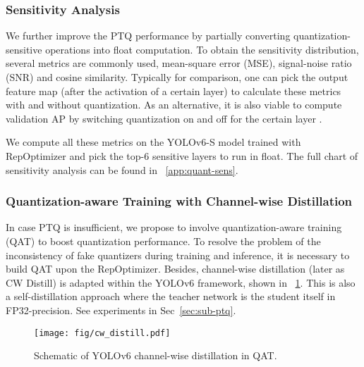 \documentclass[10pt,twocolumn,letterpaper]{article}
\begin{document}
\subsubsection{Sensitivity Analysis}\label{quant:sens}
We further improve the PTQ performance by partially converting quantization-sensitive operations into float computation. To obtain the sensitivity distribution, several metrics are commonly used, mean-square error (MSE), signal-noise ratio (SNR) and cosine similarity. Typically for comparison, one can pick the output feature map (after the activation of a certain layer) to calculate these metrics with and without quantization. As an alternative, it is also viable to compute validation AP by switching quantization on and off for the certain layer \cite{nvidia2021pq}.

We compute all these metrics on the YOLOv6-S model trained with RepOptimizer and pick the top-6 sensitive layers to run in float. The full chart of sensitivity analysis can be found in ~\ref{app:quant-sens}.


\subsubsection{Quantization-aware Training with Channel-wise Distillation}
In case PTQ is insufficient, we propose to involve quantization-aware training (QAT) to boost quantization performance. To resolve the problem of the inconsistency of fake quantizers during training and inference, it is necessary to build QAT upon the RepOptimizer. Besides, channel-wise distillation \cite{shu2021channel} (later as CW Distill) is adapted within the YOLOv6 framework, shown in ~\cref{fig:cw-distill}. This is also a self-distillation approach where the teacher network is the student itself in FP32-precision. See experiments in Sec~\ref{sec:sub-ptq}.

  \begin{figure}[htp]
    \centering
    \texttt{[image: fig/cw\_distill.pdf]}
    \caption{Schematic of YOLOv6 channel-wise distillation in QAT.}
    \label{fig:cw-distill}
  \end{figure}
  
\end{document}
